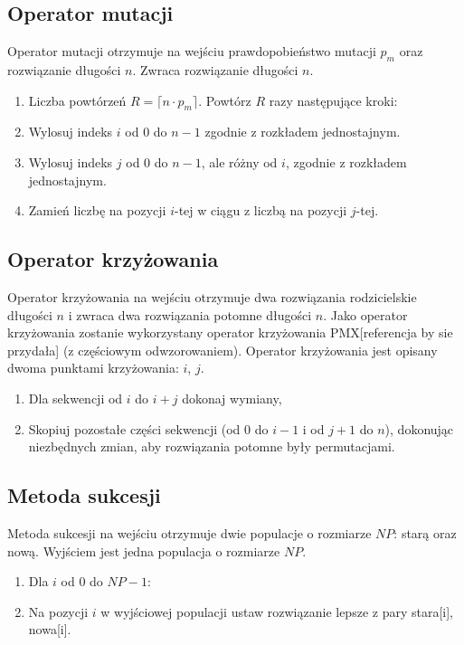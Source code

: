 \documentclass[12pt, a4paper]{article}
\begin{document}
\subsection{Operator mutacji}

Operator mutacji otrzymuje na wejściu prawdopobieństwo mutacji $p_m$ oraz rozwiązanie długości $n$.
Zwraca rozwiązanie długości $n$.

\begin{enumerate}
 \item Liczba powtórzeń $R = \lceil n \cdot  p_m \rceil$. Powtórz $R$ razy następujące kroki:
 \item Wylosuj indeks $i$ od 0 do $n-1$ zgodnie z rozkładem jednostajnym.
 \item Wylosuj indeks $j$ od 0 do $n-1$, ale różny od $i$, zgodnie z rozkładem jednostajnym.
 \item Zamień liczbę na pozycji $i$-tej w ciągu z liczbą na pozycji $j$-tej.
\end{enumerate}

\subsection{Operator krzyżowania}

Operator krzyżowania na wejściu otrzymuje dwa rozwiązania rodzicielskie długości $n$ i zwraca dwa rozwiązania potomne długości $n$. 
Jako operator krzyżowania zostanie wykorzystany operator krzyżowania {PMX}[referencja by sie przydała] (z częściowym odwzorowaniem).
Operator krzyżowania jest opisany dwoma punktami krzyżowania: $i$, $j$.
\begin{enumerate}
 \item Dla sekwencji od $i$ do $i+j$ dokonaj wymiany, %
 \item Skopiuj pozostałe części sekwencji (od $0$ do $i-1$ i od $j+1$ do $n$), dokonując niezbędnych zmian, aby rozwiązania potomne były permutacjami.
\end{enumerate}

\subsection{Metoda sukcesji}

Metoda sukcesji na wejściu otrzymuje dwie populacje o rozmiarze $NP$: starą oraz nową. Wyjściem jest jedna populacja o rozmiarze $NP$.

\begin{enumerate}
 \item Dla $i$ od 0 do $NP-1$:
 \item Na pozycji $i$ w wyjściowej populacji ustaw rozwiązanie lepsze z pary stara[i], nowa[i].
\end{enumerate}
\end{document}
